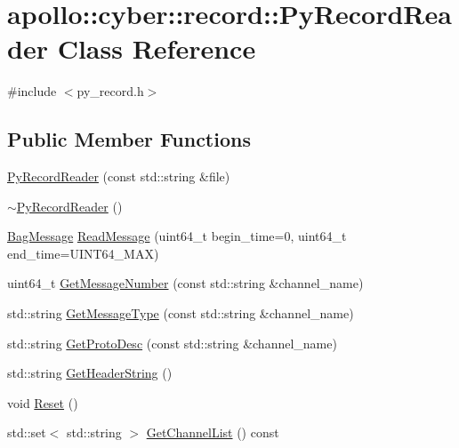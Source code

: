 \hypertarget{classapollo_1_1cyber_1_1record_1_1PyRecordReader}{\section{apollo\-:\-:cyber\-:\-:record\-:\-:Py\-Record\-Reader Class Reference}
\label{classapollo_1_1cyber_1_1record_1_1PyRecordReader}
}


{\ttfamily \#include $<$py\-\_\-record.\-h$>$}

\subsection*{Public Member Functions}
\begin{DoxyCompactItemize}
\item 
\hyperlink{classapollo_1_1cyber_1_1record_1_1PyRecordReader_a57770c8176a97006b2e587845880191d}{Py\-Record\-Reader} (const std\-::string \&file)
\item 
\hyperlink{classapollo_1_1cyber_1_1record_1_1PyRecordReader_ac0cd485b489b79567a4e657594798b21}{$\sim$\-Py\-Record\-Reader} ()
\item 
\hyperlink{structapollo_1_1cyber_1_1record_1_1BagMessage}{Bag\-Message} \hyperlink{classapollo_1_1cyber_1_1record_1_1PyRecordReader_aa682c6445ee6799d98e46f33d8353cc6}{Read\-Message} (uint64\-\_\-t begin\-\_\-time=0, uint64\-\_\-t end\-\_\-time=U\-I\-N\-T64\-\_\-\-M\-A\-X)
\item 
uint64\-\_\-t \hyperlink{classapollo_1_1cyber_1_1record_1_1PyRecordReader_afb59af31bf49af17b0642b1eff54a1ad}{Get\-Message\-Number} (const std\-::string \&channel\-\_\-name)
\item 
std\-::string \hyperlink{classapollo_1_1cyber_1_1record_1_1PyRecordReader_a338409c644018cb25538ae1b532eb48f}{Get\-Message\-Type} (const std\-::string \&channel\-\_\-name)
\item 
std\-::string \hyperlink{classapollo_1_1cyber_1_1record_1_1PyRecordReader_a2c51b1c407e5a329fa46bb3e48b97069}{Get\-Proto\-Desc} (const std\-::string \&channel\-\_\-name)
\item 
std\-::string \hyperlink{classapollo_1_1cyber_1_1record_1_1PyRecordReader_a699287ca14b87a920e345cb24c1d1894}{Get\-Header\-String} ()
\item 
void \hyperlink{classapollo_1_1cyber_1_1record_1_1PyRecordReader_a211c8acd04663a5f860c85ca3ca991d4}{Reset} ()
\item 
std\-::set$<$ std\-::string $>$ \hyperlink{classapollo_1_1cyber_1_1record_1_1PyRecordReader_a5f3da46178770a4b59a750da0b45215b}{Get\-Channel\-List} () const 
\end{DoxyCompactItemize}
